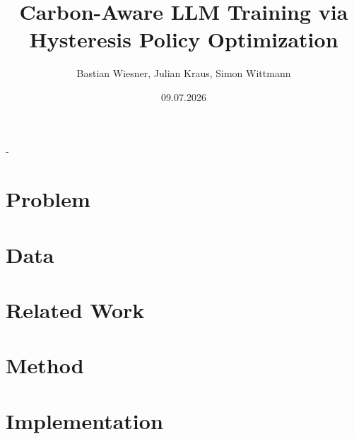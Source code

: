 \documentclass[final]{beamer}
\title[Carbon-Aware LLM Training]{Carbon-Aware LLM Training
via\\Hysteresis Policy Optimization}
\author[TheGreenEpoch]{
  Bastian Wiesner, Julian Kraus, Simon Wittmann
}
\institute[FAU]{
  Friedrich-Alexander-Universit\"at Erlangen-N\"urnberg, Computer Science 7
}
\date{09.07.2026}
\begin{document}
\begin{frame}[t,titleimagenofooter]{-}
  \titlepage
\end{frame}

\section{Problem}





\section{Data}




\section{Related Work}



\section{Method}






\section{Implementation}



\end{document}
